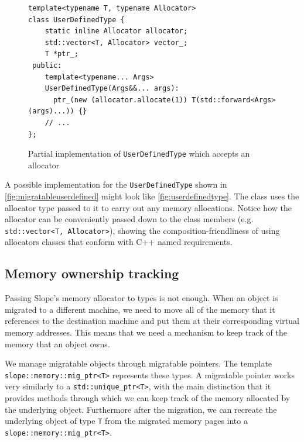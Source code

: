 \begin{figure}[t]
\begin{lstlisting}
template<typename T, typename Allocator>
class UserDefinedType {
    static inline Allocator allocator;
    std::vector<T, Allocator> vector_;
    T *ptr_;
 public:
    template<typename... Args>
    UserDefinedType(Args&&... args):
      ptr_(new (allocator.allocate(1)) T(std::forward<Args>(args)...)) {}
    // ...
};
\end{lstlisting}
\caption{ Partial implementation of \texttt{UserDefinedType} which accepts an allocator}
\label{fig:userdefinedtype}
\end{figure}


A possible implementation for the \texttt{UserDefinedType} shown in
\autoref{fig:migratableuserdefined} might look like \autoref{fig:userdefinedtype}.
The class uses the allocator type passed to it to carry out any memory
allocations. Notice how the allocator can be conveniently passed down to the
class members (e.g. \texttt{std::vector<T, Allocator>}), showing the
composition-friendliness of using allocators classes that conform with C++ named
requirements.











\subsection{Memory ownership tracking}
\label{sec:ownershiptracking}
Passing Slope's memory allocator to types is not enough.
When an object is migrated to a different machine, we need to move all of the
memory that it references to the destination machine and put them at their
corresponding virtual memory addresses. This means
that we need a mechanism to keep track of the memory that an object owns.

We manage migratable objects through migratable pointers. The template\\
\texttt{slope::memory::mig\_ptr<T>} represents these types. A migratable
pointer works very similarly to a \texttt{std::unique\_ptr<T>}, with the
main distinction that it provides methods through which we can keep track
of the memory allocated by the underlying object. Furthermore after the
migration, we can recreate the underlying object of type \texttt{T} from
the migrated memory pages into a \texttt{slope::memory::mig\_ptr<T>}.

